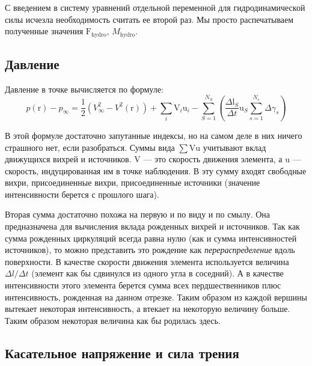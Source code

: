 \documentclass[a4paper,14pt]{extreport}
\newcommand{\br}[1]{\boldsymbol{\mathrm{#1}}}
\renewcommand{\vec}[1]{\br{#1}}
\begin{document}
С введением в систему уравнений отдельной переменной для гидродинамической силы исчезла необходимость считать ее второй раз. Мы просто распечатываем полученные значения $\vec F_\text{hydro}$, $M_\text{hydro}$.


\subsection{Давление}
Давление в точке вычисляется по формуле:
\begin{equation}
p(\vec r) - p_\infty =
\frac{1}{2} \left( V^2_\infty - V^2(\vec r) \right) 
+ \sum\limits_i{\vec V_i \vec u_i}
-\sum\limits_{S=1}^{N_S}
{
\left (
	\frac{\Delta \vec l_S}{\Delta t} \vec u_S \sum_{s=1}^{N_s} {\Delta\gamma_s}
\right )
}
\end{equation}

В этой формуле достаточно запутанные индексы, но на самом деле в них ничего страшного нет, если разобраться.
Суммы вида $\sum \vec V \vec u$ учитывают вклад движущихся вихрей и источников. $\vec V$ --- это скорость движения элемента, а $\vec u$ --- скорость, индуцированная им в точке наблюдения.
В эту сумму входят свободные вихри, присоединенные вихри, присоединенные источники (значение интенсивности берется с прошлого шага).

Вторая сумма достаточно похожа на первую и по виду и по смылу. Она предназначена для вычисления вклада рожденных вихрей и источников. Так как сумма рожденных циркуляций всегда равна нулю (как и сумма интенсивностей источников), то можно представить это рождение как \textit{перераспределение} вдоль поверхности. В качестве скорости движения элемента используется величина ${\Delta l}/{\Delta t}$ (элемент как бы сдвинулся из одного угла в соседний). А в качестве интенсивности этого элемента берется сумма всех пердшественников плюс интенсивность, рожденная на данном отрезке.
Таким образом из каждой вершины вытекает некоторая интенсивность, а втекает на некоторую величину больше. Таким образом некоторая величина как бы родилась здесь.

\subsection{Касательное напряжение и сила трения}
\end{document}
